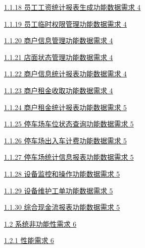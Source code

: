 \documentclass[]{article}
\begin{document}
\protect\hyperlink{ux5458ux5de5ux5de5ux8d44ux7edfux8ba1ux62a5ux8868ux751fux6210ux529fux80fdux6570ux636eux9700ux6c42}{1.1.18
  员工工资统计报表生成功能数据需求 4}

\protect\hyperlink{ux5458ux5de5ux4e34ux65f6ux6743ux9650ux7ba1ux7406ux529fux80fdux6570ux636eux9700ux6c42}{1.1.19
  员工临时权限管理功能数据需求 4}

\protect\hyperlink{ux5546ux6237ux4fe1ux606fux7ba1ux7406ux529fux80fdux6570ux636eux9700ux6c42}{1.1.20
  商户信息管理功能数据需求 4}

\protect\hyperlink{ux5e97ux9762ux72b6ux6001ux7ba1ux7406ux529fux80fdux6570ux636eux9700ux6c42}{1.1.21
  店面状态管理功能数据需求 4}

\protect\hyperlink{ux5546ux6237ux4fe1ux606fux7edfux8ba1ux62a5ux8868ux529fux80fdux6570ux636eux9700ux6c42}{1.1.22
  商户信息统计报表功能数据需求 4}

\protect\hyperlink{ux5546ux6237ux79dfux91d1ux6536ux53d6ux529fux80fdux6570ux636eux9700ux6c42}{1.1.23
  商户租金收取功能数据需求 4}

\protect\hyperlink{ux5546ux6237ux79dfux91d1ux7edfux8ba1ux62a5ux8868ux529fux80fdux6570ux636eux9700ux6c42}{1.1.24
  商户租金统计报表功能数据需求 5}

\protect\hyperlink{ux505cux8f66ux573aux8f66ux4f4dux72b6ux6001ux67e5ux8be2ux529fux80fdux6570ux636eux9700ux6c42}{1.1.25
  停车场车位状态查询功能数据需求 5}

\protect\hyperlink{ux505cux8f66ux573aux51faux5165ux8f66ux8ba1ux8d39ux529fux80fdux6570ux636eux9700ux6c42}{1.1.26
  停车场出入车计费功能数据需求 5}

\protect\hyperlink{ux505cux8f66ux573aux7edfux8ba1ux4fe1ux606fux62a5ux8868ux529fux80fdux6570ux636eux9700ux6c42}{1.1.27
  停车场统计信息报表功能数据需求 5}

\protect\hyperlink{ux8bbeux5907ux76d1ux63a7ux548cux64cdux4f5cux529fux80fdux6570ux636eux9700ux6c42}{1.1.28
  设备监控和操作功能数据需求 5}

\protect\hyperlink{ux8bbeux5907ux7ef4ux62a4ux5de5ux5355ux529fux80fdux6570ux636eux9700ux6c42}{1.1.29
  设备维护工单功能数据需求 5}

\protect\hyperlink{ux7efcux5408ux73b0ux91d1ux6d41ux62a5ux8868ux529fux80fdux6570ux636eux9700ux6c42}{1.1.30
  综合现金流报表功能数据需求 5}

\protect\hyperlink{ux7cfbux7edfux975eux529fux80fdux6027ux9700ux6c42}{1.2
  系统非功能性需求 6}

\protect\hyperlink{ux6027ux80fdux9700ux6c42}{1.2.1 性能需求 6}
\end{document}
